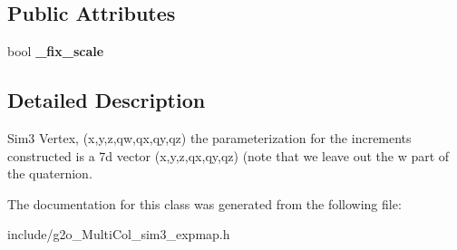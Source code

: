 \subsection*{Public Attributes}
\begin{DoxyCompactItemize}
\item 
bool {\bfseries \+\_\+fix\+\_\+scale}\hypertarget{classMultiColSLAM_1_1simpleVertexSim3Expmap_a65cc7cb2c48a005c590ffe30794511f7}{}\label{classMultiColSLAM_1_1simpleVertexSim3Expmap_a65cc7cb2c48a005c590ffe30794511f7}

\end{DoxyCompactItemize}


\subsection{Detailed Description}
Sim3 Vertex, (x,y,z,qw,qx,qy,qz) the parameterization for the increments constructed is a 7d vector (x,y,z,qx,qy,qz) (note that we leave out the w part of the quaternion. 

The documentation for this class was generated from the following file\+:\begin{DoxyCompactItemize}
\item 
include/g2o\+\_\+\+Multi\+Col\+\_\+sim3\+\_\+expmap.\+h\end{DoxyCompactItemize}
